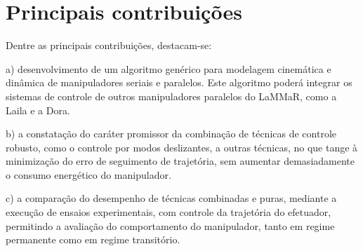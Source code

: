 \documentclass[]{politex}
\begin{document}

\section{Principais contribuições}

Dentre as principais contribuições, destacam-se:

a) desenvolvimento de um algoritmo genérico para modelagem cinemática e dinâmica de manipuladores seriais e paralelos. Este algoritmo poderá integrar os sistemas de controle de outros manipuladores paralelos do LaMMaR, como a Laila e a Dora.

b) a constatação do caráter promissor da combinação de técnicas de controle robusto, como o controle por modos deslizantes, a outras técnicas, no que tange à minimização do erro de seguimento de trajetória, sem aumentar demasiadamente o consumo energético do manipulador.

c) a comparação do desempenho de técnicas combinadas e puras, mediante a execução de ensaios experimentais, com controle da trajetória do efetuador, permitindo a avaliação do comportamento do manipulador, tanto em regime permanente como em regime transitório.
\end{document}
